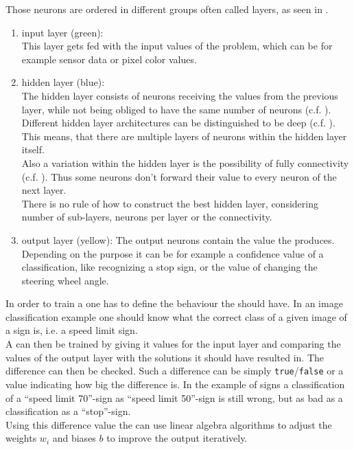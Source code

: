 Those neurons are ordered in different groups often called layers, as seen in .
\begin{enumerate}
	\item input layer (green):\\ \label{item input layer}
		This layer gets fed with the input values of the problem, which can be for example sensor data or pixel color values.
	\item hidden layer (blue):\\\label{item hidden layer}
		The hidden layer consists of neurons receiving the values from the previous layer, while not being obliged to have the same number of neurons (c.f. ).
		Different hidden layer architectures can be distinguished to be deep (c.f. ). This means, that there are multiple layers of neurons within the hidden layer itself.\\
		Also a variation within the hidden layer is the possibility of fully connectivity (c.f. ). Thus some neurons don't forward their value to every neuron of the next layer.\\
		There is no rule of how to construct the best hidden layer, considering number of sub-layers, neurons per layer or the connectivity.
	\item output layer (yellow):\label{item output layer}
		The output neurons contain the value the \nn produces. Depending on the \nns purpose it can be for example a confidence value of a classification, like recognizing a stop sign, or the value of changing the steering wheel angle. 
\end{enumerate}

In order to train a \nn one has to define the behaviour the \nn should have. In an image classification example one should know what the correct class of a given image of a sign is, i.e. a speed limit sign.\\
A \nn can then be trained by giving it values for the input layer and comparing the values of the output layer with the solutions it should have resulted in. The difference can then be checked. Such a difference can be simply \texttt{true}/\texttt{false} or a value indicating how big the difference is. In the example of signs a classification of a ``speed limit 70''-sign as ``speed limit 50''-sign is still wrong, but as bad as a classification as a ``stop''-sign.\\
Using this difference value the \nn can use linear algebra algorithms to adjust the weights $w_i$ and biases $b$ to improve the output iteratively.

